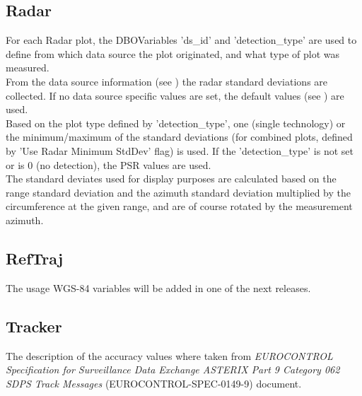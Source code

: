 \subsection{Radar}

For each Radar plot, the DBOVariables 'ds\_id' and 'detection\_type' are used to define from which data source the plot originated, and what type of plot was measured. \\

From the data source information (see ) the radar standard deviations are collected. If no data source specific values are set, the default values (see ) are used. \\

Based on the plot type defined by 'detection\_type', one (single technology) or the minimum/maximum of the standard deviations (for combined plots, defined by 'Use Radar Minimum StdDev' flag) is used. If the 'detection\_type' is not set or is 0 (no detection), the PSR values are used. \\ 

The standard deviates used for display purposes are calculated based on the range standard deviation and the azimuth standard deviation multiplied by the circumference at the given range, and are of course rotated by the measurement azimuth.

\subsection{RefTraj}

The usage WGS-84 variables will be added in one of the next releases.

\subsection{Tracker}

The description of the accuracy values where taken from \textit{EUROCONTROL Specification for Surveillance Data Exchange ASTERIX Part 9 Category 062 SDPS Track Messages} (EUROCONTROL-SPEC-0149-9) document.

